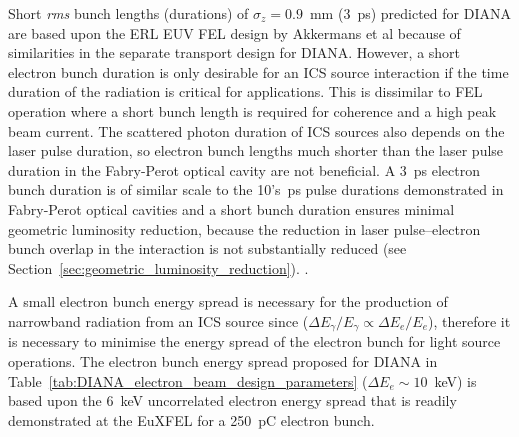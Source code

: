 \documentclass[../main.tex]{subfiles}
\begin{document}
Short \textit{rms} bunch lengths (durations) of $\sigma_{z}=0.9$~\si{\milli\meter} (3~\si{\pico\second}) predicted for DIANA are based upon the ERL EUV FEL design by Akkermans et al\cite{akkermans2017compact} because of similarities in the separate transport design for DIANA. However, a short electron bunch duration is only desirable for an ICS source interaction if the time duration of the radiation is critical for applications. This is dissimilar to FEL operation where a short bunch length is required for coherence and a high peak beam current. The scattered photon duration of ICS sources also depends on the laser pulse duration, so electron bunch lengths much shorter than the laser pulse duration in the Fabry-Perot optical cavity are not beneficial. A 3~\si{\pico\second} electron bunch duration is of similar scale to the 10's~\si{\pico\second} pulse durations demonstrated in Fabry-Perot optical cavities and a short bunch duration ensures minimal geometric luminosity reduction, because the reduction in laser pulse--electron bunch overlap in the interaction is not substantially reduced (see Section~\ref{sec:geometric_luminosity_reduction}).  . 

A small electron bunch energy spread is necessary for the production of narrowband radiation from an ICS source since ($\Delta E_{\gamma}/E_{\gamma} \propto \Delta E_{e}/E_{e}$), therefore it is necessary to minimise the energy spread of the electron bunch for light source operations. The electron bunch energy spread proposed for DIANA in Table~\ref{tab:DIANA_electron_beam_design_parameters} ($\Delta E_{e} \sim 10$~\si{\kilo\electronvolt}) is based upon the 6~\si{\kilo\electronvolt} uncorrelated electron energy spread that is readily demonstrated at the EuXFEL \cite{tomin2021accurate} for a 250~\si{\pico\coulomb} electron bunch. 
\end{document}
